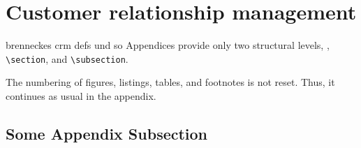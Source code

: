 \section{Customer relationship management}\label{sec:appendix01}

brenneckes crm defs und so 
Appendices provide only two structural levels, \viz, \texttt{\textbackslash section}, and \texttt{\textbackslash subsection}.

The numbering of figures, listings, tables, and footnotes is not reset. Thus, it continues as usual in the appendix.

\subsection{Some Appendix Subsection}

\lipsum[10]